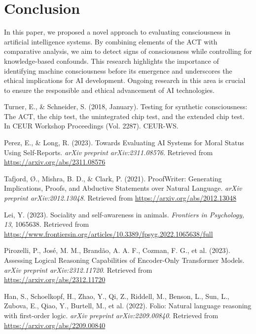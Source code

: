\documentclass{article}
\begin{document}
\section{Conclusion}
In this paper, we proposed a novel approach to evaluating consciousness in artificial intelligence systems. By combining elements of the ACT with comparative analysis, we aim to detect signs of consciousness while controlling for knowledge-based confounds. This research highlights the importance of identifying machine consciousness before its emergence and underscores the ethical implications for AI development. Ongoing research in this area is crucial to ensure the responsible and ethical advancement of AI technologies.



\begin{thebibliography}{99}

Turner, E., \& Schneider, S. (2018, January). Testing for synthetic consciousness: The ACT, the chip test, the unintegrated chip test, and the extended chip test. In CEUR Workshop Proceedings (Vol. 2287). CEUR-WS. 

Perez, E., \& Long, R. (2023). Towards Evaluating AI Systems for Moral Status Using Self-Reports. \textit{arXiv preprint arXiv:2311.08576}. Retrieved from \url{https://arxiv.org/abs/2311.08576}

Tafjord, Ø., Mishra, B. D., \& Clark, P. (2021). ProofWriter: Generating Implications, Proofs, and Abductive Statements over Natural Language. \textit{arXiv preprint arXiv:2012.13048}. Retrieved from \url{https://arxiv.org/abs/2012.13048}

Lei, Y. (2023). Sociality and self-awareness in animals. \textit{Frontiers in Psychology, 13}, 1065638. Retrieved from \url{https://www.frontiersin.org/articles/10.3389/fpsyg.2022.1065638/full}

Pirozelli, P., Jos{\'e}, M. M., Brand{\~a}o, A. A. F., Cozman, F. G., et al. (2023). Assessing Logical Reasoning Capabilities of Encoder-Only Transformer Models. \textit{arXiv preprint arXiv:2312.11720}. Retrieved from \url{https://arxiv.org/abs/2312.11720}

Han, S., Schoelkopf, H., Zhao, Y., Qi, Z., Riddell, M., Benson, L., Sun, L., Zubova, E., Qiao, Y., Burtell, M., et al. (2022). Folio: Natural language reasoning with first-order logic. \textit{arXiv preprint arXiv:2209.00840}. Retrieved from \url{https://arxiv.org/abs/2209.00840}


\end{thebibliography}
\end{document}
